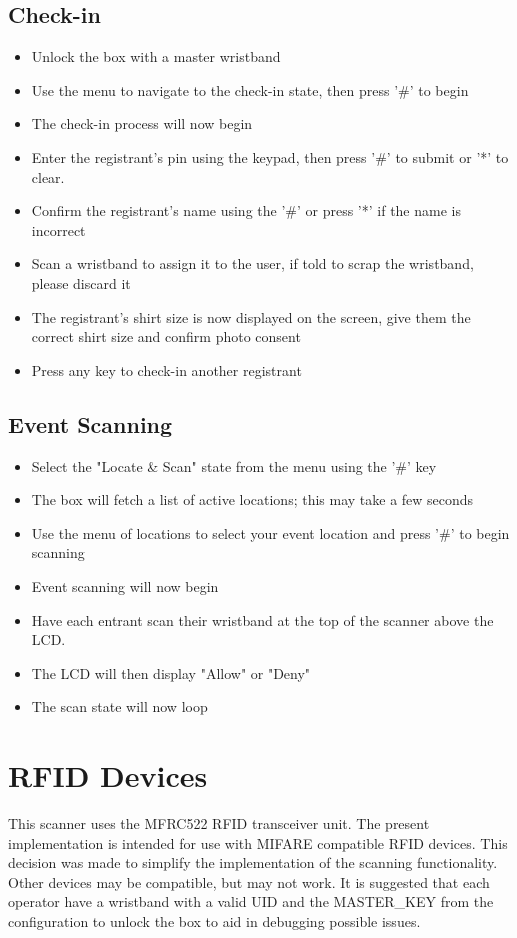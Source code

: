 \documentclass{article}
\begin{document}
\subsection{Check-in}
\begin{itemize}
	\item Unlock the box with a master wristband
	\item Use the menu to navigate to the check-in state, then press '\#' to begin
	\item The check-in process will now begin
	\item Enter the registrant's pin using the keypad, then press '\#' to submit or '*' to clear.
	\item Confirm the registrant's name using the '\#' or press '*' if the name is incorrect
	\item Scan a wristband to assign it to the user, if told to scrap the wristband, please discard it
	\item The registrant's shirt size is now displayed on the screen, give them the correct shirt size and confirm photo consent
	\item Press any key to check-in another registrant
\end{itemize}
\subsection{Event Scanning}
\begin{itemize}
	\item Select the "Locate \& Scan" state from the menu using the '\#' key
	\item The box will fetch a list of active locations; this may take a few seconds
	\item Use the menu of locations to select your event location and press '\#' to begin scanning
	\item Event scanning will now begin
	\item Have each entrant scan their wristband at the top of the scanner above the LCD.  
	\item The LCD will then display "Allow" or "Deny"
	\item The scan state will now loop
\end{itemize}

\section{RFID Devices}
This scanner uses the MFRC522 RFID transceiver unit. The present implementation is intended for use with MIFARE compatible RFID devices.  This decision was made to simplify the implementation of the scanning functionality.  Other devices may be compatible, but may not work.  It is suggested that each operator have a wristband with a valid UID and the MASTER\_KEY from the configuration to unlock the box to aid in debugging possible issues.
\end{document}
